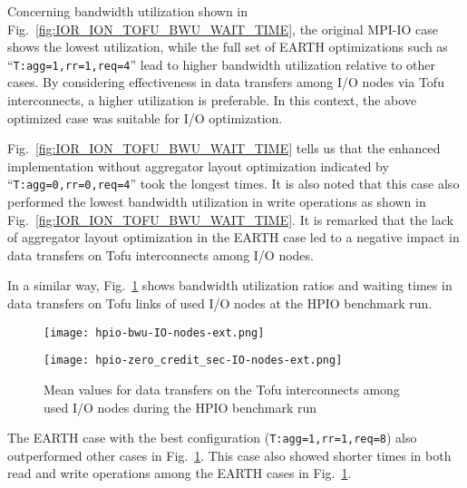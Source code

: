 \documentclass{jhps}
\begin{document}
Concerning bandwidth utilization shown in
Fig.~\ref{fig:IOR_ION_TOFU_BWU_WAIT_TIME},
the original MPI-IO case shows the lowest utilization, while the full set of EARTH 
optimizations such as “{\tt T:agg=1,rr=1,req=4}” lead to higher bandwidth utilization
relative to other cases.
By considering effectiveness in data transfers among I/O nodes via Tofu interconnects,
a higher utilization is preferable.
In this context, the above optimized case was suitable for I/O optimization.

Fig.~\ref{fig:IOR_ION_TOFU_BWU_WAIT_TIME}
tells us that the enhanced implementation
without aggregator layout optimization indicated by “{\tt T:agg=0,rr=0,req=4}”
took the longest times.
It is also noted that this case also performed the lowest bandwidth utilization
in write operations as shown in
Fig.~\ref{fig:IOR_ION_TOFU_BWU_WAIT_TIME}.
It is remarked that the lack of aggregator layout optimization in the EARTH case
led to a negative impact in data transfers on Tofu interconnects among I/O nodes.

In a similar way, Fig.~\ref{fig:HPIO_ION_TOFU_BWU_WAIT_TIME} shows
bandwidth utilization ratios and waiting times in data transfers
on Tofu links of used I/O nodes at the HPIO benchmark run.
%
\begin{figure}[htb]
\centering
\begin{minipage}[t]{0.48\textwidth}
 \centering
 \texttt{[image: hpio-bwu-IO-nodes-ext.png]}
 \label{fig:HPIO_ION_TOFU_BW_UTIL}
\end{minipage}
%
\noindent
\begin{minipage}[t]{0.48\textwidth}
 \centering
 \texttt{[image: hpio-zero\_credit\_sec-IO-nodes-ext.png]}
 \label{fig:HPIO_ION_TOFU_WAIT_TIME}
\end{minipage}
\caption{
Mean values for data transfers on the Tofu interconnects among used I/O nodes
during the HPIO benchmark run}
\label{fig:HPIO_ION_TOFU_BWU_WAIT_TIME}
\end{figure}
%
The EARTH case with the best configuration ({\tt T:agg=1,rr=1,req=8}) also
outperformed other cases in
Fig.~\ref{fig:HPIO_ION_TOFU_BWU_WAIT_TIME}.
This case also showed shorter times in both read and write operations
among the EARTH cases in
Fig.~\ref{fig:HPIO_ION_TOFU_BWU_WAIT_TIME}.
\end{document}
